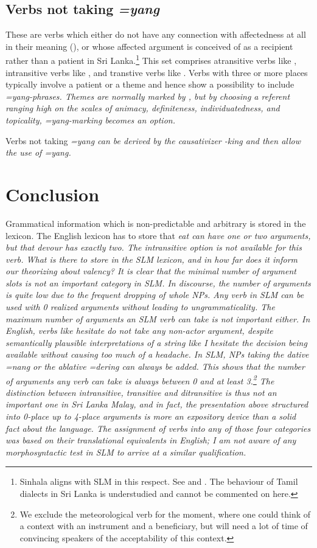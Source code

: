 \documentclass[a4paper,10pt]{article}
\begin{document}
\subsection{Verbs not taking \em =yang \em}
These are verbs which either do not have any connection with affectedness at all in their meaning (), or whose affected argument is conceived of as a recipient rather than a patient in Sri Lanka.\footnote{Sinhala 
 aligns with SLM in this respect. See \citet[36,92]{Garusinghe1962} and \citep[18f]{Gair1991infl}. The behaviour of Tamil dialects in Sri Lanka is understudied and cannot be commented on here.
} 
This set comprises atransitive verbs like , intransitive verbs like , and transtive verbs like . Verbs with three or more places typically involve a patient or a theme and hence show a possibility to include \em =yang\em-phrases. Themes are normally marked by \zero{}, but by choosing a referent ranging high on the scales of animacy, definiteness, individuatedness, and topicality, \em =yang\em-marking becomes an option.

Verbs not taking \em =yang \em can be derived by the causativizer \em -king \em and then allow the use of \em =yang\em.


\section{Conclusion}  
Grammatical information which is non-predictable and arbitrary is stored in the lexicon. The English lexicon has to store that \em eat \em can have one or two arguments, but that \em devour \em has exactly two. The intransitive option is not available for this verb. What is there to store in the SLM lexicon, and in how far does it inform our theorizing about valency? It is clear that the minimal number of argument slots is not an important category in SLM. In discourse, the number of arguments is quite low due to the frequent dropping of whole NPs. Any verb in SLM can be used with 0 realized arguments without leading to ungrammaticality. The maximum number of arguments an SLM verb can take is not important either. In English, verbs like \em hesitate \em do not take any non-actor argument, despite semantically plausible interpretations of a string like \em I hesitate the decision \em being available without causing too much of a headache.
In SLM, NPs taking the dative \em =nang \em or the ablative \em =dering \em can always be added. This shows that the number of arguments any verb can take is always between 0 and at least 3.\footnote{We 
 exclude the meteorological verb  for the moment, where one could think of a context with an instrument and a beneficiary, but will need a lot of time of convincing speakers of the acceptability of this context.}
The distinction between intransitive, transitive and ditransitive is thus not an important one in Sri Lanka Malay, and in fact, the presentation above structured into 0-place up to 4-place arguments is more an expository device than a solid fact about the language. The assignment of verbs into any of those four categories was based on their translational equivalents in English; I am not aware of any morphosyntactic test in SLM to arrive at a similar qualification.
\end{document}
